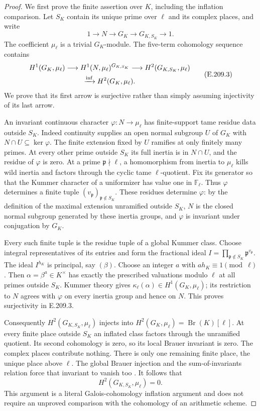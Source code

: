 \begin{proof}
We first prove the finite assertion over $K$, including the
inflation comparison. Let $S_K$ contain its unique prime over
$\ell$ and its complex places, and write
\[
 1\longrightarrow N\longrightarrow G_K
 \longrightarrow G_{K,S_K}\longrightarrow1.
\]
The coefficient $\mu_\ell$ is a trivial $G_K$-module.
The five-term cohomology sequence contains
\[
 \begin{gathered}
 H^1(G_K,\mu_\ell)\longrightarrow
 H^1(N,\mu_\ell)^{G_{K,S_K}}
 \longrightarrow H^2(G_{K,S_K},\mu_\ell)\\
 \xrightarrow{\rm inf} H^2(G_K,\mu_\ell).
 \end{gathered}                                                 \tag{E.209.3}
\]
We prove that its first arrow is surjective rather than simply
assuming injectivity of its last arrow.

An invariant continuous character $\varphi:N\to\mu_\ell$
has finite-support tame residue data outside $S_K$.
Indeed continuity supplies an open normal subgroup $U$ of
$G_K$ with $N\cap U\subseteq\ker\varphi$. The finite
extension fixed by $U$ ramifies at only finitely many primes.
At every other prime outside $S_K$ its full inertia is in
$N\cap U$, and the residue of $\varphi$ is zero.
At a prime $\mathfrak p\nmid\ell$, a homomorphism from inertia
to $\mu_\ell$ kills wild inertia and factors through the
cyclic tame $\ell$-quotient. Fix its generator so that the
Kummer character of a uniformizer has value one in
$\mathbb F_\ell$. Thus $\varphi$ determines a finite tuple
$(v_{\mathfrak p})_{\mathfrak p\notin S_K}$.
These residues determine $\varphi$: by the definition of the
maximal extension unramified outside $S_K$, $N$ is the closed
normal subgroup generated by these inertia groups, and
$\varphi$ is invariant under conjugation by $G_K$.

Every such finite tuple is the residue tuple of a global
Kummer class. Choose integral representatives of its entries
and form the fractional ideal
$I=\prod_{\mathfrak p\notin S_K}\mathfrak p^{v_{\mathfrak p}}$.
The ideal $I^{h_K}$ is principal, say $(\beta)$.
Choose an integer $a$ with $a h_K\equiv1\pmod\ell$.
Then $\alpha=\beta^a\in K^\times$ has exactly the prescribed
valuations modulo $\ell$ at all primes outside $S_K$.
Kummer theory gives $\kappa_\ell(\alpha)\in H^1(G_K,\mu_\ell)$;
its restriction to $N$ agrees with $\varphi$ on every inertia
group and hence on $N$. This proves surjectivity in E.209.3.

Consequently $H^2(G_{K,S_K},\mu_\ell)$ injects into
$H^2(G_K,\mu_\ell)=\operatorname{Br}(K)[\ell]$.
At every finite place outside $S_K$ an inflated class factors
through the unramified quotient. Its second cohomology is
zero, so its local Brauer invariant is zero. The complex
places contribute nothing. There is only one remaining
finite place, the unique place above $\ell$. The global
Brauer injection and the sum-of-invariants relation force
that invariant to vanish too
\citep[II.2.1--2.2, pp.~163--165]{CohMilneADT}.
It follows that
\[
                  H^2(G_{K,S_K},\mu_\ell)=0.                    \tag{E.209.4}
\]
This argument is a literal Galois-cohomology inflation
argument and does not require an unproved comparison with
the cohomology of an arithmetic scheme.


\end{proof}
